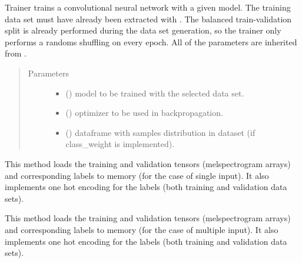 \documentclass[letterpaper,10pt,english]{sphinxmanual}
\begin{document}
\begin{fulllineitems}
\label{\detokenize{train:train.Trainer}}
Trainer trains a convolutional neural network with a given model. The training data set
must have already been extracted with . The balanced train-validation
split is already performed during the data set generation, so the trainer only performs
a randoms shuffling on every epoch. All of the parameters are inherited from .
\begin{quote}\begin{description}
\item[{Parameters}] \leavevmode\begin{itemize}
\item {} 
 () \textendash{} model to be trained with the selected data set.

\item {} 
 () \textendash{} optimizer to be used in backpropagation.

\item {} 
 () \textendash{} dataframe with samples distribution in dataset (if class\_weight is implemented).

\end{itemize}

\end{description}\end{quote}

\begin{fulllineitems}
\label{\detokenize{train:train.Trainer.load_data}}
This method loads the training and validation tensors (melspectrogram arrays) and 
corresponding labels to memory (for the case of single input). It also implements one hot encoding for the labels
(both training and validation data sets).

\end{fulllineitems}


\begin{fulllineitems}
\label{\detokenize{train:train.Trainer.load_multi_data}}
This method loads the training and validation tensors (melspectrogram arrays) and 
corresponding labels to memory (for the case of multiple input). It also implements one hot encoding for the labels
(both training and validation data sets).


\end{fulllineitems}
\end{fulllineitems}
\end{document}
